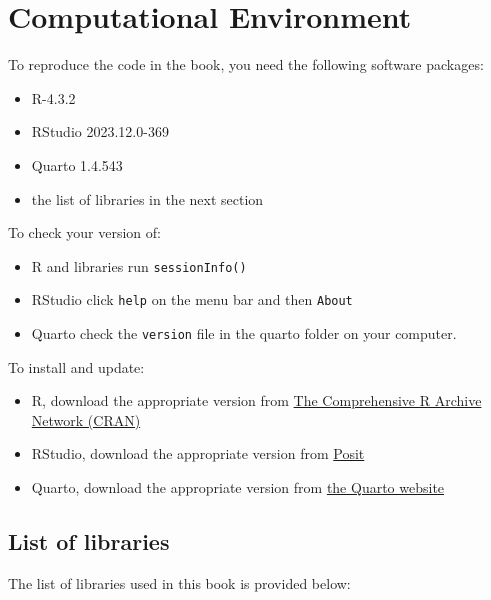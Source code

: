\documentclass[
  letterpaper,
  DIV=11,
  numbers=noendperiod]{scrreprt}
\providecommand{\tightlist}{%
  \setlength{\itemsep}{0pt}\setlength{\parskip}{0pt}}\usepackage{longtable,booktabs,array}
\begin{document}
\hypertarget{computational-environment}{%
\section{Computational Environment}\label{computational-environment}}

To reproduce the code in the book, you need the following software
packages:

\begin{itemize}
\tightlist
\item
  R-4.3.2
\item
  RStudio 2023.12.0-369
\item
  Quarto 1.4.543
\item
  the list of libraries in the next section
\end{itemize}

To check your version of:

\begin{itemize}
\tightlist
\item
  R and libraries run \texttt{sessionInfo()}
\item
  RStudio click \texttt{help} on the menu bar and then \texttt{About}
\item
  Quarto check the \texttt{version} file in the quarto folder on your
  computer.
\end{itemize}

To install and update:

\begin{itemize}
\tightlist
\item
  R, download the appropriate version from
  \href{https://cran.r-project.org}{The Comprehensive R Archive Network
  (CRAN)}
\item
  RStudio, download the appropriate version from
  \href{https://posit.co/download/rstudio-desktop/}{Posit}
\item
  Quarto, download the appropriate version from
  \href{https://quarto.org/docs/get-started/}{the Quarto website}
\end{itemize}

\hypertarget{list-of-libraries}{%
\subsection{List of libraries}\label{list-of-libraries}}

The list of libraries used in this book is provided below:
\end{document}
